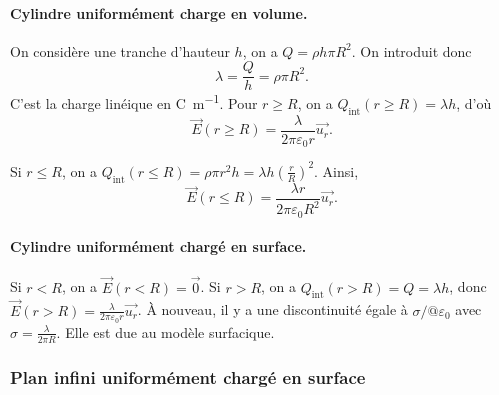             \paragraph{Cylindre uniformément charge en volume.} 
            
                On considère une tranche d'hauteur $h$, on a $Q=\rho h\pi R^{2}$. On introduit donc 
                \begin{equation}
                    \boxed{
                        \lambda=\frac{Q}{h}=\rho\pi R^{2}.
                    }
                \end{equation}
                C'est la charge linéique en \si{\coulomb\per\metre}. Pour $r\geqslant R$, on a $Q_{\text{int}}(r\geqslant R)=\lambda h$, d'où 
                \begin{equation}
                    \boxed{
                        \vec{E}(r\geqslant R)=\frac{\lambda}{2\pi\varepsilon_{0}r}\vec{u_r}.
                    }
                \end{equation}

                Si $r\leqslant R$, on a $Q_{\text{int}}(r\leqslant R)=\rho \pi r^{2}h=\lambda h\left(\frac{r}{R}\right)^{2}$. Ainsi,
                \begin{equation}
                    \boxed{
                        \vec{E}(r\leqslant R)=\frac{\lambda r}{2\pi\varepsilon_{0}R^{2}}\vec{u_r}.
                    }
                \end{equation}

            \paragraph{Cylindre uniformément chargé en surface.} 

                Si $r<R$, on a $\vec{E}(r<R)=\vec{0}$. Si $r>R$, on a $Q_{\text{int}}(r>R)=Q=\lambda h$, donc $\vec{E}(r>R)=\frac{\lambda}{2\pi\varepsilon_{0}r}\vec{u_r}$. À nouveau, il y a une discontinuité égale à $\sigma/@\varepsilon_{0}$ avec $\sigma=\frac{\lambda}{2\pi R}$. Elle est due au modèle surfacique.

            
        \subsubsection{Plan infini uniformément chargé en surface}

